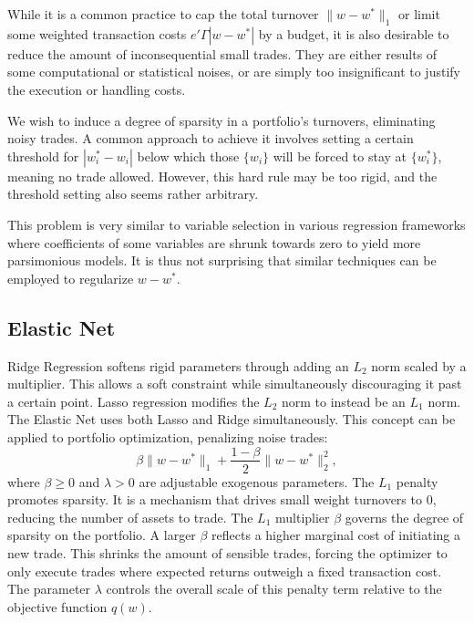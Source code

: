 \documentclass[11pt, letterpaper]{article}
\begin{document}
While it is a common practice to cap the total turnover $\lVert w - w^*\rVert_1$ or limit some weighted transaction costs
$e'\Gamma |w - w^*|$ by a budget, it is also desirable to reduce the amount of inconsequential small trades. They are either
results of some computational or statistical noises, or are simply too insignificant to justify the execution or handling
costs.

We wish to induce a degree of sparsity in a portfolio's turnovers, eliminating noisy trades. A common approach to achieve it
involves setting a certain threshold for $\left |w^*_i - w_i \right|$ below which those $\{w_i\}$ will be forced to stay at
$\{w_i^*\}$, meaning no trade allowed. However, this hard rule may be too rigid, and the threshold setting also seems rather
arbitrary.

This problem is very similar to variable selection in various regression frameworks where coefficients of some variables are
shrunk towards zero to yield more parsimonious models. It is thus not surprising that similar techniques can be employed to
regularize $w - w^*$.

\subsection{Elastic Net}

Ridge Regression \cite{hoerl1970ridge} softens rigid parameters through adding an $L_2$ norm scaled by a multiplier. This allows a soft constraint while
simultaneously discouraging it past a certain point. Lasso regression \cite{tibshirani1996lasso} modifies the $L_2$ norm to instead be an $L_1$ norm.
The Elastic Net \cite{zou2005elasticnet} uses both Lasso and Ridge simultaneously. This concept can be applied to portfolio optimization,
penalizing noise trades:
\begin{equation}
	\label{elastic_net_objective}
	\beta \lVert w-w^*\rVert_1 + \frac{1 - \beta}{2} \lVert w-w^*\rVert_2^2,
\end{equation}
where $\beta \geq 0$ and $\lambda > 0$ are adjustable exogenous parameters. The $L_1$ penalty promotes sparsity. It is a
mechanism that drives small weight turnovers to $0$, reducing the number of assets to trade. The $L_1$ multiplier $\beta$
governs the degree of sparsity on the portfolio. A larger $\beta$ reflects a higher marginal cost of initiating a new
trade. This shrinks the amount of sensible trades, forcing the optimizer to only execute trades where expected returns outweigh
a fixed transaction cost. The parameter $\lambda$ controls the overall scale of this penalty term relative to the objective
function $q(w)$.
\end{document}
